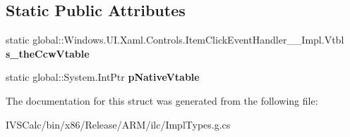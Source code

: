 \subsection*{Static Public Attributes}
\begin{DoxyCompactItemize}
\item 
\mbox{\label{struct_windows_1_1_u_i_1_1_xaml_1_1_controls_1_1_item_click_event_handler_____impl_1_1_vtbl_a4bb5b51056cafcc9fa1656b79ab0dd5f}} 
static global\+::\+Windows.\+U\+I.\+Xaml.\+Controls.\+Item\+Click\+Event\+Handler\+\_\+\+\_\+\+Impl.\+Vtbl {\bfseries s\+\_\+the\+Ccw\+Vtable}
\item 
\mbox{\label{struct_windows_1_1_u_i_1_1_xaml_1_1_controls_1_1_item_click_event_handler_____impl_1_1_vtbl_af400ddf4dabb953dc2c135ed6fb2eb2b}} 
static global\+::\+System.\+Int\+Ptr {\bfseries p\+Native\+Vtable}
\end{DoxyCompactItemize}


The documentation for this struct was generated from the following file\+:\begin{DoxyCompactItemize}
\item 
I\+V\+S\+Calc/bin/x86/\+Release/\+A\+R\+M/ilc/Impl\+Types.\+g.\+cs\end{DoxyCompactItemize}
